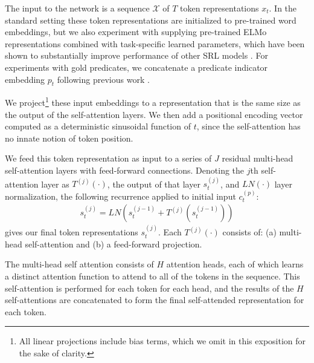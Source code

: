 \documentclass[11pt,a4paper]{article}
\begin{document}
The input to the network is a sequence $\mathcal{X}$ of $T$ token representations $x_t$. In the standard setting these token representations are initialized to pre-trained word embeddings, but we also experiment with supplying pre-trained ELMo representations combined with task-specific learned parameters, which have been shown to substantially improve performance of other SRL models \citep{peters2018deep}.
For experiments with gold predicates, we concatenate a predicate indicator embedding $p_t$ following previous work \citep{he2017deep}.


We project\footnote{All linear projections include bias terms, which we omit in this exposition for the sake of clarity.} these input embeddings to a representation that is the same size as the output of the self-attention layers. We then add a positional encoding vector computed as a deterministic sinusoidal function of $t$, since the self-attention has no innate notion of token position. 









We feed this token representation as input to a series of $J$ residual multi-head self-attention layers with feed-forward connections. Denoting the $j$th self-attention layer as $T^{(j)}(\cdot)$, the output of that layer $s_t^{(j)}$, and $LN(\cdot)$ layer normalization, the following recurrence applied to initial input $c_t^{(p)}$:
\begin{align}
\label{eqn:overall}
s_t^{(j)} = LN(s_t^{(j-1)} + T^{(j)}(s_t^{(j-1)}))
\end{align}
gives our final token representations $s_t^{(j)}$. Each $T^{(j)}(\cdot)$ consists of: (a) multi-head self-attention and (b) a feed-forward projection.

The multi-head self attention consists of $H$ attention heads, each of which learns a distinct attention function to attend to all of the tokens in the sequence. This self-attention is performed for each token for each head, and the results of the $H$ self-attentions are concatenated to form the final self-attended representation for each token. 
\end{document}
